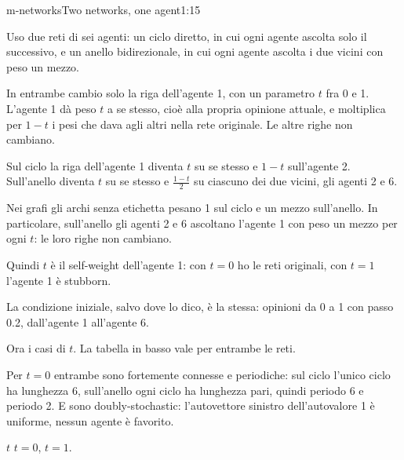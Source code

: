 \begin{slidedue}{m-networks}{Two networks, one agent}{1:15 {\color{red}}}
  \begin{discorso}
    \item Uso due reti di sei agenti: un ciclo diretto, in cui ogni agente ascolta solo il successivo, e un anello bidirezionale, in cui ogni agente ascolta i due vicini con peso un mezzo.
    \item {\color{blue}In entrambe cambio solo la riga dell'agente 1, con un parametro $t$ fra 0 e 1. L'agente 1 dà peso $t$ a se stesso, cioè alla propria opinione attuale, e moltiplica per $1-t$ i pesi che dava agli altri nella rete originale. Le altre righe non cambiano.}
    \item {\color{blue}Sul ciclo la riga dell'agente 1 diventa $t$ su se stesso e $1-t$ sull'agente 2. Sull'anello diventa $t$ su se stesso e $\frac{1-t}{2}$ su ciascuno dei due vicini, gli agenti 2 e 6.}
    \item {\color{blue}Nei grafi gli archi senza etichetta pesano 1 sul ciclo e un mezzo sull'anello. In particolare, sull'anello gli agenti 2 e 6 ascoltano l'agente 1 con peso un mezzo per ogni $t$: le loro righe non cambiano.}
    \item {\color{blue}Quindi $t$ è il self-weight dell'agente 1: con $t=0$ ho le reti originali, con $t=1$ l'agente 1 è stubborn.}
    \item {\color{blue}La condizione iniziale, salvo dove lo dico, è la stessa: opinioni da 0 a 1 con passo 0.2, dall'agente 1 all'agente 6.}
    \item {\color{blue}\clic Ora i casi di $t$. La tabella in basso vale per entrambe le reti.}
    \item Per $t=0$ entrambe sono fortemente connesse e periodiche: sul ciclo l'unico ciclo ha lunghezza 6, sull'anello ogni ciclo ha lunghezza pari, quindi periodo 6 e periodo 2. E sono doubly-stochastic: l'autovettore sinistro dell'autovalore 1 è uniforme, nessun agente è favorito.
    \item {\color{red}     } {\color{red}$t$} {\color{red}                 } {\color{red}$t=0$,} {\color{red}  } {\color{red}$t=1$.}

\end{discorso}
\end{slidedue}
